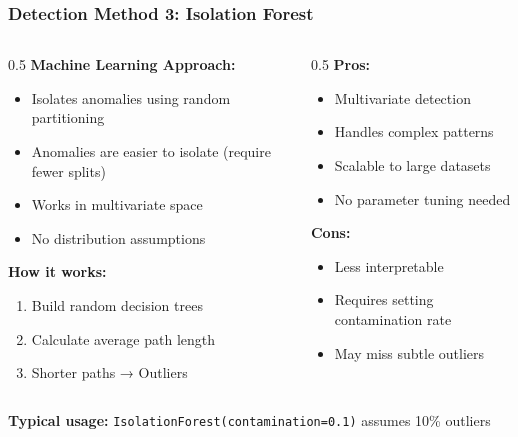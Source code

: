 \documentclass[aspectratio=169]{beamer}
\begin{document}
\begin{frame}
\frametitle{Detection Method 3: Isolation Forest}

\begin{columns}[T]
    \begin{column}{0.5\textwidth}
        \textbf{Machine Learning Approach:}
        \begin{itemize}
            \item Isolates anomalies using random partitioning
            \item Anomalies are easier to isolate (require fewer splits)
            \item Works in multivariate space
            \item No distribution assumptions
        \end{itemize}

        \vspace{0.3cm}

        \textbf{How it works:}
        \begin{enumerate}
            \item Build random decision trees
            \item Calculate average path length
            \item Shorter paths → Outliers
        \end{enumerate}
    \end{column}
    \begin{column}{0.5\textwidth}
        \textbf{Pros:}
        \begin{itemize}
            \item Multivariate detection
            \item Handles complex patterns
            \item Scalable to large datasets
            \item No parameter tuning needed
        \end{itemize}

        \vspace{0.3cm}

        \textbf{Cons:}
        \begin{itemize}
            \item Less interpretable
            \item Requires setting contamination rate
            \item May miss subtle outliers
        \end{itemize}
    \end{column}
\end{columns}

\vspace{0.3cm}

\textbf{Typical usage:} \texttt{IsolationForest(contamination=0.1)} assumes 10\% outliers

\end{frame}
\end{document}
